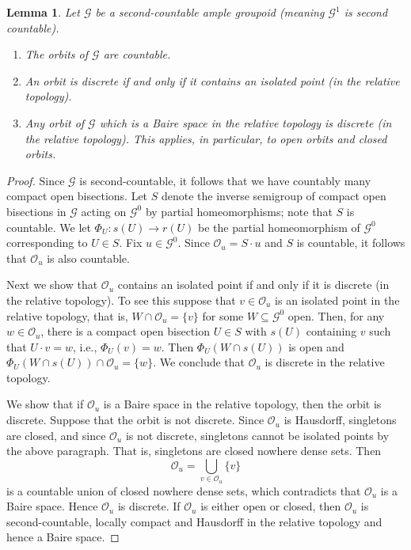\documentclass[11pt,reqno]{amsart}
\theoremstyle{plain}
\newtheorem{lem}[thm]{Lemma}
\numberwithin{equation}{section}
\newcommand{\G}[0]{\mathscr{G}}
\newcommand{\orb}[0]{\mathcal{O}}
\begin{document}
\begin{lem}\label{lem:discreteorbits}
	Let $\G$ be a second-countable ample groupoid (meaning $\mathscr G^1$ is second countable).
\begin{enumerate}	
\item The orbits of $\G$ are countable.
\item An orbit is discrete  if and only if it contains an isolated point (in the relative topology).
\item Any orbit of $\G$ which is a Baire space in the relative topology is discrete (in the relative topology).  This applies, in particular, to open orbits and closed orbits.
\end{enumerate}
\end{lem}
	\begin{proof}
		Since $\G$ is second-countable, it follows that we have countably many compact open bisections. Let $S$ denote the inverse semigroup of compact open bisections in $\G$ acting on $\G^0$ by partial homeomorphisms; note that $S$ is countable.  We let $\Phi_U\colon s(U)\to r(U)$ be the partial homeomorphism of $\mathscr G^0$ corresponding to $U\in S$.  Fix $u\in\mathscr G^0$. Since $\orb_u=S\cdot u$ and $S$ is countable, it follows that $\orb_u$ is also countable.
		
Next we show that $\orb_u$ contains an isolated point if and only if it is discrete (in the relative topology). To see this suppose that $v\in\orb_u$ is an isolated point in the relative topology, that is,  $W\cap \orb_u=\{v\}$ for some $W\subseteq \mathscr G^0$ open. Then, for any $w\in\orb_u$, there is a compact open bisection $U\in S$ with $s(U)$ containing $v$ such that $U\cdot v=w$, i.e., $\Phi_U(v)=w$. Then $\Phi_U(W\cap s(U))$ is open and $\Phi_U(W\cap s(U))\cap \orb_u = \{w\}$.  We conclude that $\orb_u$ is discrete in the relative topology.
		
We show that if $\orb_u$ is a Baire space in the relative topology, then the orbit is discrete.  Suppose that the orbit is not discrete.   Since $\orb_u$ is Hausdorff, singletons are closed, and since $\orb_u$ is not discrete, singletons cannot be isolated points by the above paragraph. That is, singletons are  closed nowhere dense sets. Then
		\[\orb_u=\bigcup_{v\in\orb_u}\{v\}\] is a countable union of closed nowhere dense sets,
		which contradicts that $\orb_u$ is a Baire space.   Hence $\orb_u$ is discrete.   If $\orb_u$ is either open or closed, then $\orb_u$ is second-countable, locally compact and Hausdorff in the relative topology and hence a Baire space.
\end{proof}
\end{document}
